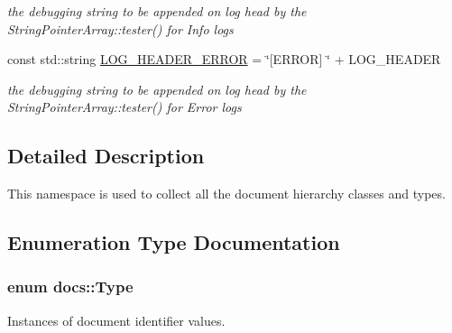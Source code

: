 \begin{DoxyCompactItemize}
\begin{DoxyCompactList}\small\item\em the debugging string to be appended on log head by the String\-Pointer\-Array\-::tester() for Info logs \end{DoxyCompactList}\item 
\hypertarget{namespacedocs_a40d84f797e577f18ef9b303de5a409b8}{const std\-::string \hyperlink{namespacedocs_a40d84f797e577f18ef9b303de5a409b8}{L\-O\-G\-\_\-\-H\-E\-A\-D\-E\-R\-\_\-\-E\-R\-R\-O\-R} = \char`\"{}\mbox{[}E\-R\-R\-O\-R\mbox{]} \char`\"{} + L\-O\-G\-\_\-\-H\-E\-A\-D\-E\-R}\label{namespacedocs_a40d84f797e577f18ef9b303de5a409b8}

\begin{DoxyCompactList}\small\item\em the debugging string to be appended on log head by the String\-Pointer\-Array\-::tester() for Error logs \end{DoxyCompactList}\end{DoxyCompactItemize}


\subsection{Detailed Description}
This namespace is used to collect all the document hierarchy classes and types. 

\subsection{Enumeration Type Documentation}
\hypertarget{namespacedocs_a150efca62822b8ab62a5afabe299bf75}{
\subsubsection[{Type}]{\setlength{\rightskip}{0pt plus 5cm}enum {\bf docs\-::\-Type}}}\label{namespacedocs_a150efca62822b8ab62a5afabe299bf75}


Instances of document identifier values. 

